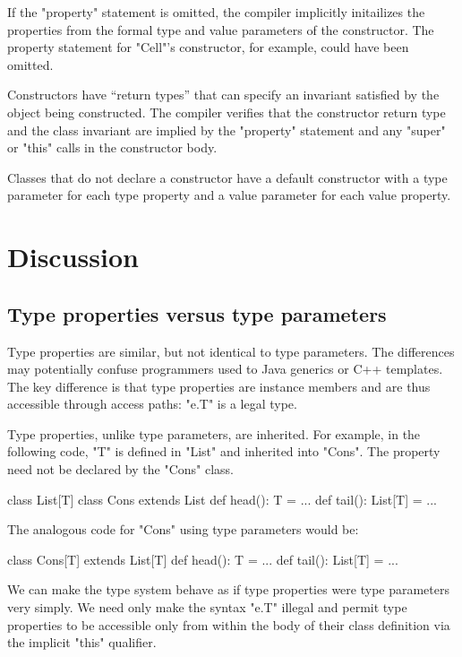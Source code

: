 \documentclass[nocopyrightspace,9pt]{sigplanconf}
\begin{document}
If the \xcd"property" statement is omitted, the compiler implicitly
initailizes the properties from the formal type and value parameters
of the constructor.  The property statement for \xcd"Cell"'s constructor,
for example, could have been omitted.

Constructors have ``return
types'' that can specify an invariant satisfied by the object being
constructed.  The compiler verifies that the
constructor return type and the class invariant are implied by the
\xcd"property" statement and any \xcd"super"
or \xcd"this" calls in the constructor body.

Classes that do not declare a constructor 
have a default constructor with a type parameter for each
type property and a value parameter for each value property.

\section{Discussion}

\subsection{Type properties versus type parameters}

Type properties are similar, but not identical to type parameters.  The
differences may potentially confuse programmers used to Java generics or C++
templates.  The key difference is that type properties are instance members and
are thus accessible through access paths: \xcd"e.T" is a legal type.

Type properties, unlike type parameters, are inherited.
For example, in the following code, \xcd"T" is defined in \xcd"List"
and inherited into \xcd"Cons".  The property need not be
declared by the \xcd"Cons" class.
\begin{xten}
class List[T] { }
class Cons extends List {
    def head(): T = { ... }
    def tail(): List[T] = { ... }
}
\end{xten}
The analogous code for \xcd"Cons" using type parameters would be:
\begin{xten}
class Cons[T] extends List[T] {
    def head(): T = { ... }
    def tail(): List[T] = { ... }
}
\end{xten}

We can make the type system behave as if type properties were
type parameters very simply.  We need only make the syntax \xcd"e.T"
illegal and permit type properties to be accessible only
from within the body of their class definition via the implicit \xcd"this"
qualifier.
\end{document}
